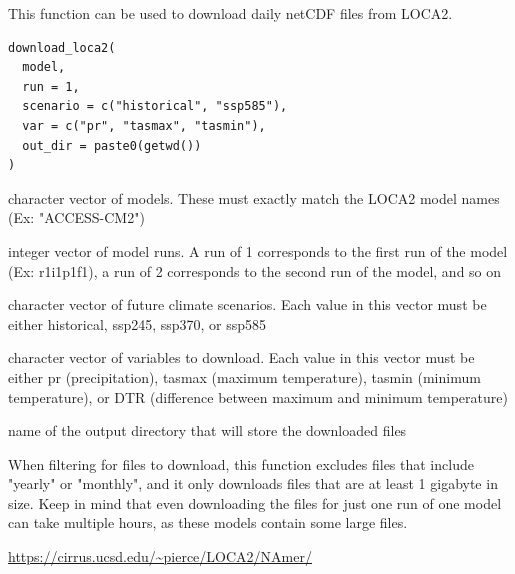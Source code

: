 %
\begin{Description}
This function can be used to download daily netCDF files from LOCA2.
\end{Description}
%
\begin{Usage}
\begin{verbatim}
download_loca2(
  model,
  run = 1,
  scenario = c("historical", "ssp585"),
  var = c("pr", "tasmax", "tasmin"),
  out_dir = paste0(getwd())
)
\end{verbatim}
\end{Usage}
%
\begin{Arguments}
\begin{ldescription}
\item[\code{model}] character vector of models. These must exactly
match the LOCA2 model names (Ex: "ACCESS-CM2")

\item[\code{run}] integer vector of model runs. A run of 1 corresponds to the
first run of the model (Ex: r1i1p1f1), a run of 2 corresponds to the second
run of the model, and so on

\item[\code{scenario}] character vector of future climate scenarios. Each value
in this vector must be either historical, ssp245, ssp370, or ssp585

\item[\code{var}] character vector of variables to download. Each value in this
vector must be either pr (precipitation), tasmax (maximum temperature),
tasmin (minimum temperature), or DTR (difference between maximum and
minimum temperature)

\item[\code{out\_dir}] name of the output directory that will store the
downloaded files
\end{ldescription}
\end{Arguments}
%
\begin{Details}
When filtering for files to download, this function excludes files
that include "yearly" or "monthly", and it only downloads files that are
at least 1 gigabyte in size. Keep in mind that even downloading the files
for just one run of one model can take multiple hours, as these models
contain some large files.
\end{Details}
%
\begin{Source}
\url{https://cirrus.ucsd.edu/~pierce/LOCA2/NAmer/}
\end{Source}
